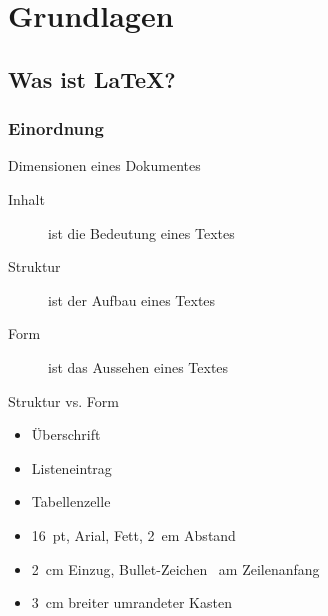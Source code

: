 \chapter{Grundlagen}


\website

\section{Was ist \LaTeX?}

\subsection{Einordnung}

\begin{Frame}{Dimensionen eines Dokumentes}
  \begin{description}
    \item[Inhalt] ist die \alert{Bedeutung} eines Textes
    \item[Struktur] ist der \alert{Aufbau} eines Textes
    \item[Form] ist das \alert{Aussehen} eines Textes
  \end{description}
\end{Frame}

\begin{Frame}{Struktur vs. Form}
  \begin{Beispiel}[Strukturelemente]
    \begin{itemize}
      \item Überschrift
      \item Listeneintrag
      \item Tabellenzelle
    \end{itemize}
  \end{Beispiel}

  \xxx

  \begin{Beispiel}[Formen]
    \begin{itemize}
      \item 16~pt, Arial, Fett, 2~em Abstand
      \item 2~cm Einzug, Bullet-Zeichen \textbullet\ am Zeilenanfang
      \item 3~cm breiter umrandeter Kasten
    \end{itemize}
  \end{Beispiel}
\end{Frame}

